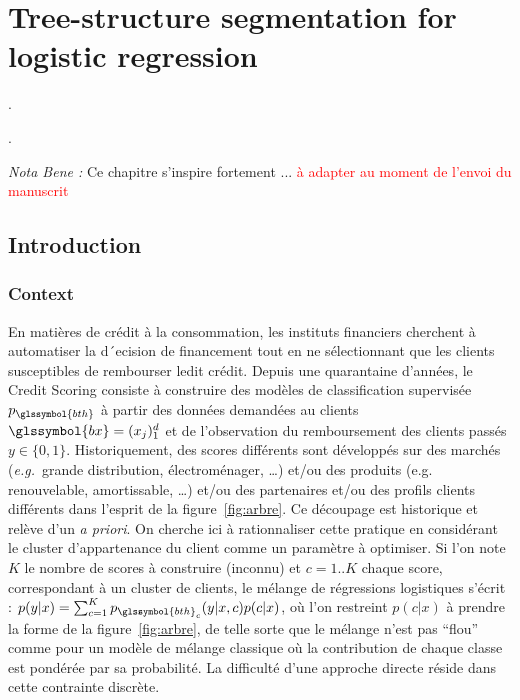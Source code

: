 \chapter{Tree-structure segmentation for logistic regression} \label{chap6}

\epigraph{.}{.}

\minitoc


\textit{Nota Bene :} Ce chapitre s'inspire fortement ... \textcolor{red}{à adapter au moment de l'envoi du manuscrit}

\bigskip





\section{Introduction}

\subsection{Context}

En matières de crédit à la consommation, les instituts financiers cherchent à automatiser la d´ecision de financement tout en ne sélectionnant que les clients susceptibles de rembourser ledit crédit. Depuis une quarantaine d’années, le Credit Scoring consiste à construire des modèles de classification supervisée $p_{\glssymbol{bth}}$ à partir des données demandées au clients $\glssymbol{bx} = (x_j)_1^d$ et de l’observation du remboursement des clients passés $y \in \{0, 1\}$. Historiquement, des scores différents sont développés sur des marchés (\textit{e.g.}\ grande distribution, électroménager, \dots) et/ou des produits (e.g. renouvelable, amortissable, \dots) et/ou des partenaires et/ou des profils clients différents dans l’esprit de la figure~\ref{fig:arbre}. Ce découpage est historique et relève d’un \textit{a priori}. On cherche ici à rationnaliser cette pratique en considérant le cluster d’appartenance du client comme un paramètre à optimiser. Si l’on note $K$ le nombre de scores à construire (inconnu) et $c = 1..K$ chaque score, correspondant à un cluster de clients, le mélange de régressions logistiques s’écrit : $p(y|x) = \sum_{c=1}^K p_{\glssymbol{bth}_c}(y|x, c)p(c|x)$, où l’on restreint $p(c|x)$ à prendre la forme de la figure~\ref{fig:arbre}, de telle sorte que le mélange n’est pas “flou” comme pour un modèle de mélange classique où la contribution de chaque classe est pondérée par sa probabilité. La
difficulté d’une approche directe réside dans cette contrainte discrète.


